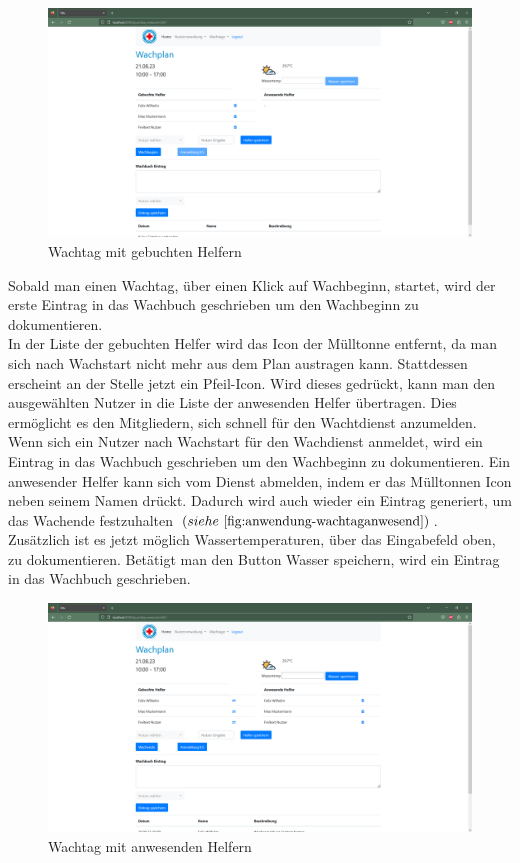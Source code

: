 \documentclass[fontsize=12pt,openright,oneside,paper=a4,BCOR=1cm]{scrbook}
\begin{document}
\begin{figure}[H]
  \centering
    \includegraphics[width=0.7\linewidth]{Anlagen/Anwendung/8-1WachtagNutzerGebucht.png}
    \caption{Wachtag mit gebuchten Helfern}
  \label{fig:anwendung-wachtaggebucht}
\end{figure}

Sobald man einen Wachtag, \"uber einen Klick auf \glqq Wachbeginn\grqq{}, startet, wird der erste Eintrag in das Wachbuch geschrieben um den Wachbeginn zu dokumentieren. \\
In der Liste der gebuchten Helfer wird das Icon der M\"ulltonne entfernt, da man sich nach Wachstart nicht mehr aus dem Plan austragen kann. Stattdessen erscheint an der Stelle jetzt ein Pfeil-Icon. Wird dieses gedr\"uckt, kann man den ausgew\"ahlten Nutzer in die Liste der anwesenden Helfer \"ubertragen. Dies erm\"oglicht es den Mitgliedern, sich schnell f\"ur den Wachtdienst anzumelden. \\
Wenn sich ein Nutzer nach Wachstart f\"ur den Wachdienst anmeldet, wird ein Eintrag in das Wachbuch geschrieben um den Wachbeginn zu dokumentieren. Ein anwesender Helfer kann sich vom Dienst abmelden, indem er das M\"ulltonnen Icon neben seinem Namen dr\"uckt. Dadurch wird auch wieder ein Eintrag generiert, um das Wachende festzuhalten $(siehe~\ref{fig:anwendung-wachtaganwesend})$. \\
Zus\"atzlich ist es jetzt m\"oglich Wassertemperaturen, \"uber das Eingabefeld oben, zu dokumentieren. Bet\"atigt man den Button \glqq Wasser speichern\grqq{}, wird ein Eintrag in das Wachbuch geschrieben. \\

\begin{figure}[H]
  \centering
    \includegraphics[width=0.7\linewidth]{Anlagen/Anwendung/8-3WachtagAnwesendeNutzer.png}
    \caption{Wachtag mit anwesenden Helfern}
  \label{fig:anwendung-wachtaganwesend}
\end{figure}
\end{document}
